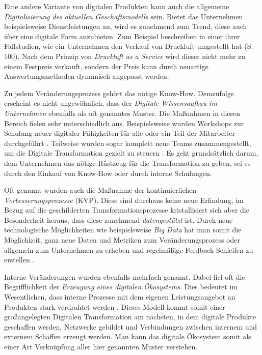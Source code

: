 Eine andere Variante von digitalen Produkten kann auch die allgemeine \textit{Digitalisierung des aktuellen Geschäftsmodells} sein. Bietet das Unternehmen beispielsweise Dienstleistungen an, wird es zunehmend zum Trend, diese auch über eine digitale Form anzubieten. Zum Beispiel beschreiben  in einer ihrer Fallstudien, wie ein Unternehmen den Verkauf von Druckluft umgestellt hat (S. 100). Nach dem Prinzip von \textit{Druckluft as a Service} wird dieser nicht mehr zu einem Festpreis verkauft, sondern der Preis kann durch neuartige Auswertungsmethoden dynamisch angepasst werden.

Zu jedem Veränderungsprozess gehört das nötige  Know-How. Demzufolge erscheint es nicht ungewöhnlich, dass der \textit{Digitale Wissensaufbau im Unternehmen} ebenfalls als oft genanntes Muster. Die Maßnahmen in diesen Bereich fielen sehr unterschiedlich aus. Beispielsweise wurden Workshops zur Schulung neuer digitaler Fähigkeiten für alle oder ein Teil der Mitarbeiter durchgeführt \cite[S. 177]{gassmann_digitale_2016}. Teilweise wurden sogar komplett neue Teams zusammengestellt, um die Digitale Transformation gezielt zu steuern \cite[S. 139]{urbach_digitalization_2018}. Es geht grundsätzlich darum, dem Unternehmen das nötige Rüstzeug für die Transformation zu geben, sei es durch den Einkauf von Know-How oder durch interne Schulungen.

Oft genannt wurden auch die Maßnahme der kontinuierlichen \textit{Verbesserungsprozesse} (KVP). Diese sind durchaus keine neue Erfindung, im Bezug auf die geschilderten Transformationsprozesse kristallisiert sich  aber die  Besonderheit heraus, dass diese zunehmend \textit{datengestützt} ist. Durch neue technologische Möglichkeiten wie beispielsweise \textit{Big Data} hat man somit die Möglichkeit, ganz neue Daten und Metriken zum Veränderungsprozess oder allgemein zum Unternehmen zu erheben und regelmäßige Feedback-Schleifen zu erstellen \cite[S. 8]{beule_digital_2019}.

Interne Veränderungen wurden ebenfalls mehrfach genannt. Dabei fiel oft die Begrifflichkeit der \textit{Erzeugung eines digitalen Ökosystems}. Dies bedeutet im Wesentlichen, dass interne Prozesse mit dem eigenen Leistungsangebot an Produkten stark verdrahtet werden \cite[S. 127]{heinemann_digitale_2016}. Dieses Modell kommt somit einer großangelegten Digitalen Transformation am nächsten, in dem digitale Produkte geschaffen werden, Netzwerke gebildet und Verbindungen zwischen internem und externem Schaffen erzeugt werden. Man kann das digitale Ökosystem somit als einer Art Verknüpfung aller hier genannten Muster verstehen.

